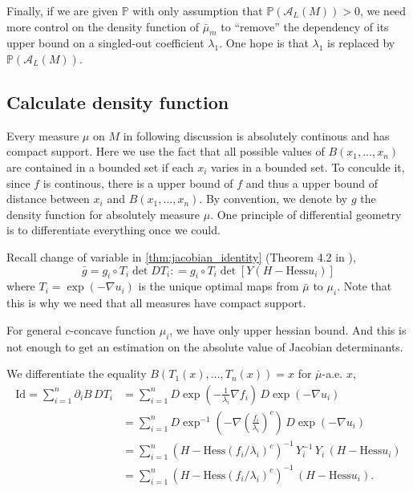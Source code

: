 
Finally, if we are given $\mathbb{P}$ with only assumption that $\mathbb{P}(\mathcal{A}_L(M)) > 0$,
we need more control on the density function of $\bar{\mu}_m$
to ``remove'' the dependency of its upper bound on a singled-out coefficient $\lambda_1$.
One hope is that $\lambda_1$ is replaced by $\mathbb{P}(\mathcal{A}_L(M))$.


\subsection{Calculate density function}

Every measure $\mu$ on $M$ in following discussion is absolutely continous and has compact support.
Here we use the fact that all possible values of $B(x_1, \ldots, x_n)$ are contained in a bounded set if each $x_i$ varies in a bounded set.
To conculde it, since $f$ is continous, there is a upper bound of $f$ and thus a upper bound of distance between $x_i$ and $B(x_1, \ldots, x_n)$.
By convention, we denote by $g$ the density function for absolutely measure $\mu$.
One principle of differential geometry is to differentiate everything once we could.

Recall change of variable in \cref{thm:jacobian_identity} (Theorem 4.2 in \cite{cordero2001riemannian}),
\[
	\bar{g} = g_i \circ T_i \det D T_i :
	= g_i \circ T_i \det[Y(H-\text{Hess} u_i)]
\]
where $T_i = \exp(-\nabla u_i)$ is the unique optimal maps from $\bar{\mu}$ to $\mu_i$.
Note that this is why we need that all measures have compact support.

For general $c$-concave function $\mu_i$, we have only upper hessian bound.
And this is not enough to get an estimation on the absolute value of Jacobian determinants.

We differentiate the equality $B(T_1(x), \ldots, T_n(x))=x$ for $\bar{\mu}$-a.e. $x$,
\begin{align*}
	\text{Id} =\sum_{i=1}^n \partial_i B\, DT_i
	 & =\sum_{i=1}^n D \exp(-\frac{1}{\lambda_i}\nabla f_i) \, D \exp(-\nabla u_i)                     \\
	 & =\sum_{i=1}^n D \exp^{-1}(-\nabla \left( \frac{f_i}{\lambda_i}\right)^c) \, D \exp(-\nabla u_i) \\
	 & =\sum_{i=1}^n(H-\text{Hess}(f_i / \lambda_i)^c)^{-1}\,Y_i^{-1}\,
	Y_i\,(H-\text{Hess} u_i)                                                                           \\
	 & =\sum_{i=1}^n(H-\text{Hess}(f_i / \lambda_i)^c)^{-1}\,
	(H-\text{Hess}u_i) .
\end{align*}

